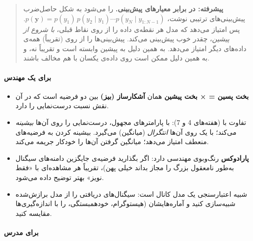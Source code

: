 \begin{quote}
\textbf{پیشرفته:  در برابر معیارهای پیش‌بینی.}
 را می‌شود به شکل حاصل‌ضرب پیش‌بینی‌های ترتیبی نوشت،
\(p(\mathbf{y}) = p(y_1)\,p(y_2\mid y_1)\cdots p(y_N\mid y_{1:N-1})\).
پس امتیاز می‌دهد که مدل هر نقطه‌ی داده را از روی نقاط قبلی، \emph{با شروع
از پیشین}، چقدر خوب پیش‌بینی می‌کند.  پیش‌بینی‌ها را از روی
(تقریباً) همه‌ی داده‌های دیگر امتیاز می‌دهد. به همین دلیل 
به پیشین وابسته است و  تقریباً نه، و به همین دلیل ممکن است روی
داده‌ی یکسان با هم مخالف باشند.
\end{quote}

\paragraph{برای یک مهندس}

\begin{itemize}
\tightlist
\item
  \textbf{بخت پسین =  × بخت پیشین} همان \textbf{آشکارساز 
  (بیز)} بین دو فرضیه است که در آن  نقش نسبت درست‌نمایی
  را دارد.
\item
  تفاوت با \textbf{} (هفته‌های 4 و 7): با پارامترهای مجهول،
   درست‌نمایی را روی آن‌ها \emph{بیشینه} می‌کند؛ 
  با یک  روی آن‌ها \emph{انتگرال} (میانگین) می‌گیرد. بیشینه کردن
  به فرضیه‌های منعطف امتیاز می‌دهد؛ میانگین گرفتن آن‌ها را خودکار جریمه
  می‌کند.
\item
  \textbf{پارادوکس } رنگ‌وبوی مهندسی دارد: اگر
  بگذارید فرضیه‌ی جایگزین دامنه‌های سیگنال به‌طور نامعقول بزرگ را مجاز
  بداند  خیلی پهن)، تقریباً هر مشاهده‌ای با «فقط نویز» بهتر
  توضیح داده می‌شود.
\item
  \textbf{} شبیه اعتبارسنجی یک مدل کانال
  است: سیگنال‌های دریافتی را از مدل برازش‌شده شبیه‌سازی کنید و آماره‌هایشان
  (هیستوگرام، خودهمبستگی،  را با اندازه‌گیری‌ها مقایسه
  کنید.
\end{itemize}

\paragraph{برای مدرس}

